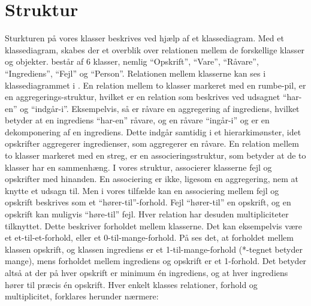 \section{Struktur}
\label{sec:struktur}

Sturkturen på vores klasser beskrives ved hjælp af et klassediagram. Med et klassediagram, skabes der et overblik over relationen mellem de forskellige klasser og objekter. \Foodl{} består af 6 klasser, nemlig ``Opskrift'', ``Vare'', ``Råvare'', ``Ingrediens'', ``Fejl'' og ``Person''. Relationen mellem klasserne kan ses i klassediagrammet i . En relation mellem to klasser markeret med en rumbe-pil, er en aggregerings-struktur, hvilket er en relation som beskrives ved udsagnet ``har-en'' og ``indgår-i''. Eksempelvis, så er råvare en aggregering af ingrediens, hvilket betyder at en ingrediens ``har-en'' råvare, og en råvare ``ingår-i'' og er en dekomponering af en ingrediens. Dette indgår samtidig i et hierarkimønster, idet opskrifter aggregerer ingredienser, som aggregerer en råvare. En relation mellem to klasser markeret med en streg, er en associeringsstruktur, som betyder at de to klasser har en sammenhæng. I vores struktur, associerer klasserne fejl og opskrifter med hinanden. En associering er ikke, ligesom en aggregering, nem at knytte et udsagn til. Men i vores tilfælde kan en associering mellem fejl og opskrift beskrives som et ``hører-til''-forhold. Fejl ``hører-til'' en opskrift, og en opskrift kan muligvis ``høre-til'' fejl. Hver relation har desuden multipliciteter tilknyttet. Dette beskriver forholdet mellem klasserne. Det kan eksempelvis være et et-til-et-forhold, eller et 0-til-mange-forhold. På  ses det, at forholdet mellem klassen opskrift, og klassen ingrediens er et 1-til-mange-forhold (*-tegnet betyder mange), mens forholdet mellem ingrediens og opskrift er et 1-forhold. Det betyder altså at der på hver opskrift er minimum én ingrediens, og at hver ingrediens hører til præcis én opskrift. Hver enkelt klasses relationer, forhold og multiplicitet, forklares herunder nærmere:




